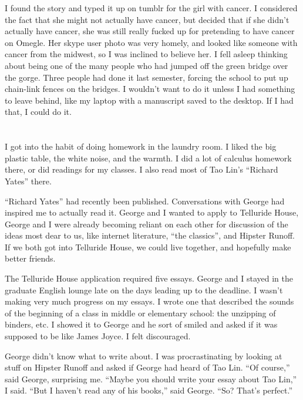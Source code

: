 I found the story and typed it up on tumblr for the girl with cancer.  I
considered the fact that she might not actually have cancer, but decided that if
she didn't actually have cancer, she was still really fucked up for pretending
to have cancer on Omegle.  Her skype user photo was very homely, and looked like
someone with cancer from the midwest, so I was inclined to believe her.  I fell
asleep thinking about being one of the many people who had jumped off the green
bridge over the gorge.  Three people had done it last semester, forcing the
school to put up chain-link fences on the bridges.  I wouldn't want to do it
unless I had something to leave behind, like my laptop with a manuscript saved
to the desktop.  If I had that, I could do it.

\section{}

I got into the habit of doing homework in the laundry room.  I liked the big
plastic table, the white noise, and the warmth.  I did a lot of calculus
homework there, or did readings for my classes.  I also read most of Tao
Lin's ``Richard Yates'' there.  

``Richard Yates'' had recently been published.  Conversations with George had
inspired me to actually read it.  George and I wanted to apply to Telluride
House,  George and I were already becoming reliant
on each other for discussion of the ideas most dear to us, like internet
literature, ``the classics'', and Hipster Runoff.  If we both got into Telluride
House, we could live together, and hopefully make better friends.

The Telluride House application required five essays.  George and I stayed in
the graduate English lounge late on the days leading up to the deadline.  I
wasn't making very much progress on my essays.  I wrote one that described the
sounds of the beginning of a class in middle or elementary school: the unzipping
of binders, etc.  I showed it to George and he sort of smiled and asked if it
was supposed to be like James Joyce.  I felt discouraged. 

George didn't know what to write about.  I was procrastinating by looking at
stuff on Hipster Runoff and asked if George had heard of Tao Lin.  ``Of
course,'' said George, surprising me.  ``Maybe you should write your essay about
Tao Lin,'' I said.  ``But I haven't read any of his books,'' said George.  ``So?
That's perfect.''

